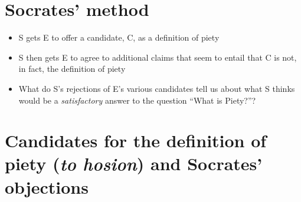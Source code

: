 \documentclass[11pt]{article}
\begin{document}
\section*{Socrates' method}

\begin{itemize}
\item{S gets E to offer a candidate, C, as a definition of piety}\item{S then gets E to agree to additional claims that seem to entail that C is not, in fact, the definition of piety}\item{What do S's rejections of E's various candidates tell us about what S thinks would be a \emph{satisfactory} answer to the question ``What is Piety?''?}\end{itemize}

\section*{Candidates for the definition of piety (\emph{to hosion}) and Socrates' objections}
\end{document}
